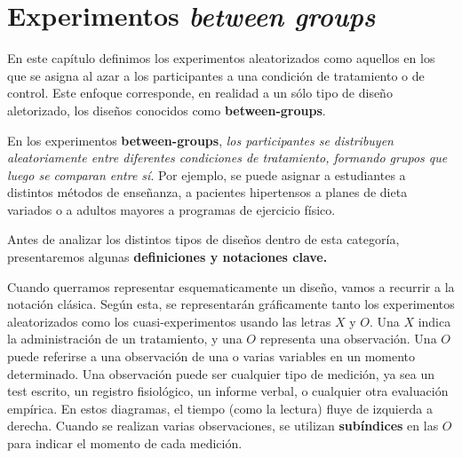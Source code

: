 \documentclass[
  letterpaper,
  DIV=11,
  numbers=noendperiod,
  oneside]{scrreprt}
\begin{document}
\hypertarget{experimentos-between-groups}{%
\section{\texorpdfstring{Experimentos \emph{between
groups}}{Experimentos between groups}}\label{experimentos-between-groups}}

\begin{tcolorbox}[enhanced jigsaw, breakable, rightrule=.15mm, colbacktitle=quarto-callout-warning-color!10!white, bottomtitle=1mm, arc=.35mm, titlerule=0mm, left=2mm, toprule=.15mm, leftrule=.75mm, colback=white, opacitybacktitle=0.6, opacityback=0, colframe=quarto-callout-warning-color-frame, bottomrule=.15mm, coltitle=black, toptitle=1mm, title={Hablemos un poco de la nomenclatura}]

\end{tcolorbox}

En este capítulo definimos los experimentos aleatorizados como aquellos
en los que se asigna al azar a los participantes a una condición de
tratamiento o de control. Este enfoque corresponde, en realidad a un
sólo tipo de diseño aletorizado, los diseños conocidos como
\textbf{between-groups}.

En los experimentos \textbf{between-groups}, \emph{los participantes se
distribuyen aleatoriamente entre diferentes condiciones de tratamiento,
formando grupos que luego se comparan entre sí}. Por ejemplo, se puede
asignar a estudiantes a distintos métodos de enseñanza, a pacientes
hipertensos a planes de dieta variados o a adultos mayores a programas
de ejercicio físico.

Antes de analizar los distintos tipos de diseños dentro de esta
categoría, presentaremos algunas \textbf{definiciones y notaciones
clave.}

Cuando querramos representar esquematicamente un diseño, vamos a
recurrir a la notación clásica. Según esta, se representarán
gráficamente tanto los experimentos aleatorizados como los
cuasi-experimentos usando las letras \(X\) y \(O\). Una \(X\) indica la
administración de un tratamiento, y una \(O\) representa una
observación. Una \(O\) puede referirse a una observación de una o varias
variables en un momento determinado. Una observación puede ser cualquier
tipo de medición, ya sea un test escrito, un registro fisiológico, un
informe verbal, o cualquier otra evaluación empírica. En estos
diagramas, el tiempo (como la lectura) fluye de izquierda a derecha.
Cuando se realizan varias observaciones, se utilizan \textbf{subíndices}
en las \(O\) para indicar el momento de cada medición.
\end{document}
